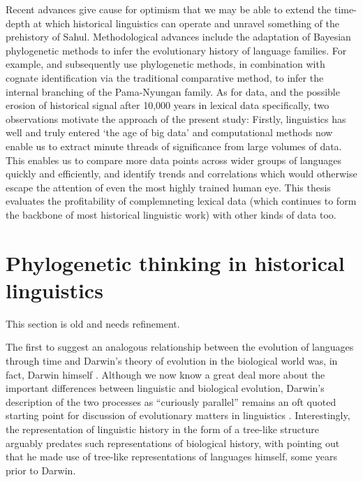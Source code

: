 Recent advances give cause for optimism that we may be able to extend the time-depth at which historical linguistics can operate and unravel something of the prehistory of Sahul. Methodological advances include the adaptation of Bayesian phylogenetic methods to infer the evolutionary history of language families. For example, \textcite{bowern_computational_2012} and subsequently \textcite{bouckaert_origin_2018} use phylogenetic methods, in combination with cognate identification via the traditional comparative method, to infer the internal branching of the Pama-Nyungan family. As for data, and the possible erosion of historical signal after 10,000 years in lexical data specifically, two observations motivate the approach of the present study: Firstly, linguistics has well and truly entered `the age of big data' and computational methods now enable us to extract minute threads of significance from large volumes of data. This enables us to compare more data points across wider groups of languages quickly and efficiently, and identify trends and correlations which would otherwise escape the attention of even the most highly trained human eye. This thesis evaluates the profitability of complemneting lexical data (which continues to form the backbone of most historical linguistic work) with other kinds of data too.

\hypertarget{phylogenetic-thinking-in-historical-linguistics}{%
\section{Phylogenetic thinking in historical linguistics}\label{phylogenetic-thinking-in-historical-linguistics}}

This section is old and needs refinement.

The first to suggest an analogous relationship between the evolution of languages through time and Darwin's theory of evolution in the biological world was, in fact, Darwin himself \autocite{darwin_origin_1859}. Although we now know a great deal more about the important differences between linguistic and biological evolution, Darwin's \autocite{darwin_descent_1888} description of the two processes as ``curiously parallel'' remains an oft quoted starting point for discussion of evolutionary matters in linguistics \autocite[e.g.][]{atkinson_curious_2005}. Interestingly, the representation of linguistic history in the form of a tree-like structure arguably predates such representations of biological history, with \textcite{schleicher_darwinsche_1863} pointing out that he made use of tree-like representations of languages himself, some years prior to Darwin.

